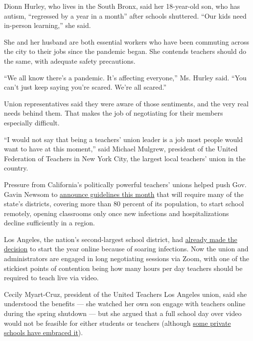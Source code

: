 Dionn Hurley, who lives in the South Bronx, said her 18-year-old son,
who has autism, ``regressed by a year in a month'' after schools
shuttered. ``Our kids need in-person learning,'' she said.

She and her husband are both essential workers who have been commuting
across the city to their jobs since the pandemic began. She contends
teachers should do the same, with adequate safety precautions.

``We all know there's a pandemic. It's affecting everyone,'' Ms. Hurley
said. ``You can't just keep saying you're scared. We're all scared.''

Union representatives said they were aware of those sentiments, and the
very real needs behind them. That makes the job of negotiating for their
members especially difficult.

``I would not say that being a teachers' union leader is a job most
people would want to have at this moment,'' said Michael Mulgrew,
president of the United Federation of Teachers in New York City, the
largest local teachers' union in the country.

Pressure from California's politically powerful teachers' unions helped
push Gov. Gavin Newsom to
\href{https://www.nytimes3xbfgragh.onion/2020/07/17/us/california-schools-reopening-newsom.html}{announce
guidelines this month} that will require many of the state's districts,
covering more than 80 percent of its population, to start school
remotely, opening classrooms only once new infections and
hospitalizations decline sufficiently in a region.

Los Angeles, the nation's second-largest school district, had
\href{https://www.nytimes3xbfgragh.onion/2020/07/13/us/lausd-san-diego-school-reopening.html}{already
made the decision} to start the year online because of soaring
infections. Now the union and administrators are engaged in long
negotiating sessions via Zoom, with one of the stickiest points of
contention being how many hours per day teachers should be required to
teach live via video.

Cecily Myart-Cruz, president of the United Teachers Los Angeles union,
said she understood the benefits --- she watched her own son engage with
teachers online during the spring shutdown --- but she argued that a
full school day over video would not be feasible for either students or
teachers (although
\href{https://www.nytimes3xbfgragh.onion/2020/05/09/us/coronavirus-public-private-school.html}{some
private schools have embraced it}).

